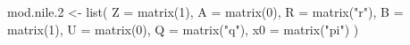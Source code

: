 \begin{Schunk}
\begin{Sinput}
 mod.nile.2 <- list(
   Z = matrix(1), A = matrix(0), R = matrix("r"),
   B = matrix(1), U = matrix(0), Q = matrix("q"),
   x0 = matrix("pi")
 )
\end{Sinput}
\end{Schunk}
